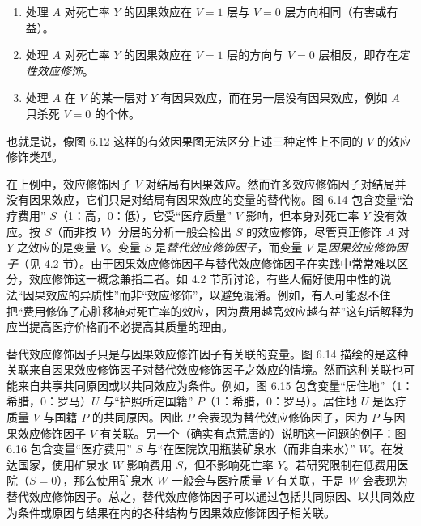 \begin{enumerate}
\item 处理 $A$ 对死亡率 $Y$ 的因果效应在 $V=1$ 层与 $V=0$ 层方向相同（有害或有益）。
\item 处理 $A$ 对死亡率 $Y$ 的因果效应在 $V=1$ 层的方向与 $V=0$ 层相反，即存在\emph{定性效应修饰}。
\item 处理 $A$ 在 $V$ 的某一层对 $Y$ 有因果效应，而在另一层没有因果效应，例如 $A$ 只杀死 $V=0$ 的个体。
\end{enumerate}

也就是说，像图 6.12 这样的有效因果图无法区分上述三种定性上不同的 $V$ 的效应修饰类型。

在上例中，效应修饰因子 $V$ 对结局有因果效应。然而许多效应修饰因子对结局并没有因果效应，它们只是对结局有因果效应的变量的替代物。图 6.14 包含变量“治疗费用” $S$（1：高，0：低），它受“医疗质量” $V$ 影响，但本身对死亡率 $Y$ 没有效应。按 $S$（而非按 $V$）分层的分析一般会检出 $S$ 的效应修饰，尽管真正修饰 $A$ 对 $Y$ 之效应的是变量 $V$。变量 $S$ 是\emph{替代效应修饰因子}，而变量 $V$ 是\emph{因果效应修饰因子}（见 4.2 节）。由于因果效应修饰因子与替代效应修饰因子在实践中常常难以区分，效应修饰这一概念兼指二者。如 4.2 节所讨论，有些人偏好使用中性的说法“因果效应的异质性”而非“效应修饰”，以避免混淆。例如，有人可能忍不住把“费用修饰了心脏移植对死亡率的效应，因为费用越高效应越有益”这句话解释为应当提高医疗价格而不必提高其质量的理由。

\begin{figure}[htbp]
\centering
{}
\caption{}
\label{fig:6.14}
\end{figure}

替代效应修饰因子只是与因果效应修饰因子有关联的变量。图 6.14 描绘的是这种关联来自因果效应修饰因子对替代效应修饰因子之效应的情境。然而这种关联也可能来自共享共同原因或以共同效应为条件。例如，图 6.15 包含变量“居住地”（1：希腊，0：罗马）$U$ 与“护照所定国籍” $P$（1：希腊，0：罗马）。居住地 $U$ 是医疗质量 $V$ 与国籍 $P$ 的共同原因。因此 $P$ 会表现为替代效应修饰因子，因为 $P$ 与因果效应修饰因子 $V$ 有关联。另一个（确实有点荒唐的）说明这一问题的例子：图 6.16 包含变量“医疗费用” $S$ 与“在医院饮用瓶装矿泉水（而非自来水）” $W$。在发达国家，使用矿泉水 $W$ 影响费用 $S$，但不影响死亡率 $Y$。若研究限制在低费用医院（$S=0$），那么使用矿泉水 $W$ 一般会与医疗质量 $V$ 有关联，于是 $W$ 会表现为替代效应修饰因子。总之，替代效应修饰因子可以通过包括共同原因、以共同效应为条件或原因与结果在内的各种结构与因果效应修饰因子相关联。

